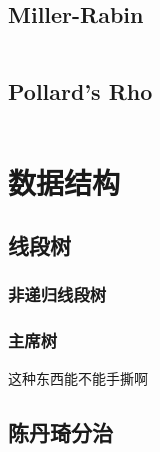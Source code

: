 \documentclass[a4paper]{article}
\begin{document}
\begin{multicols}{2}


			\subsection{Miller-Rabin}
				\inputminted{cpp}{../src/numbertheory/Miller-Rabin.cpp}

			\subsection{Pollard's Rho}
				\inputminted{cpp}{../src/numbertheory/Pollard-Rho.cpp}
			


				

		\section{数据结构}

			\subsection{线段树}
				\subsubsection{非递归线段树}
					

				\subsubsection{主席树}
					这种东西能不能手撕啊

			\subsection{陈丹琦分治}
				\inputminted{cpp}{../src/datastructure/CDQ分治.cpp}




\end{multicols}
\end{document}

